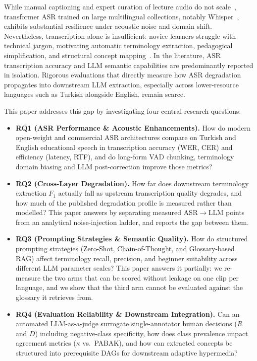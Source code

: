 \documentclass[conference]{IEEEtran}
\begin{document}
While manual captioning and expert curation of lecture audio do not scale~\cite{southwell2022}, transformer ASR trained on large multilingual collections, notably Whisper~\cite{radford2023}, exhibits substantial resilience under acoustic noise and domain shift. Nevertheless, transcription alone is insufficient: novice learners struggle with technical jargon, motivating automatic terminology extraction, pedagogical simplification, and structural concept mapping~\cite{tran2026,conde2016}. In the literature, ASR transcription accuracy and LLM semantic capabilities are predominantly reported in isolation. Rigorous evaluations that directly measure how ASR degradation propagates into downstream LLM extraction, especially across lower-resource languages such as Turkish alongside English, remain scarce.

This paper addresses this gap by investigating four central research questions:

\begin{itemize}
\item \textbf{RQ1 (ASR Performance \& Acoustic Enhancements).} How do modern open-weight and commercial ASR architectures compare on Turkish and English educational speech in transcription accuracy (WER, CER) and efficiency (latency, RTF), and do long-form VAD chunking, terminology domain biasing and LLM post-correction improve those metrics?
\item \textbf{RQ2 (Cross-Layer Degradation).} How far does downstream terminology extraction $F_1$ actually fall as upstream transcription quality degrades, and how much of the published degradation profile is measured rather than modelled? This paper answers by separating measured ASR$\to$LLM points from an analytical noise-injection ladder, and reports the gap between them.
\item \textbf{RQ3 (Prompting Strategies \& Semantic Quality).} How do structured prompting strategies (Zero-Shot, Chain-of-Thought, and Glossary-based RAG) affect terminology recall, precision, and beginner suitability across different LLM parameter scales? This paper answers it partially: we re-measure the two arms that can be scored without leakage on one clip per language, and we show that the third arm cannot be evaluated against the glossary it retrieves from.
\item \textbf{RQ4 (Evaluation Reliability \& Downstream Integration).} Can an automated LLM-as-a-judge surrogate single-annotator human decisions ($R$ and $D$) including negative-class specificity, how does class prevalence impact agreement metrics ($\kappa$ vs.\ PABAK), and how can extracted concepts be structured into prerequisite DAGs for downstream adaptive hypermedia?
\end{itemize}
\end{document}
